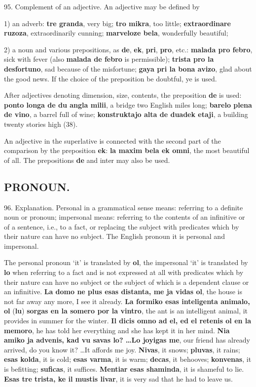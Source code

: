 95. Complement of an adjective. An adjective may be defined by 

1) an adverb: \textbf{tre granda}, very big; \textbf{tro mikra}, too little; \textbf{extraordinare ruzoza}, extraordinarily cunning; \textbf{marveloze bela}, wonderfully beautiful; 

2) a noun and various prepositions, as \textbf{de}, \textbf{ek}, \textbf{pri}, \textbf{pro}, etc.: \textbf{malada pro febro}, sick with fever (also \textbf{malada de febro} is permissible); \textbf{trista pro la desfortuno}, sad because of the misfortune; \textbf{gaya pri la bona avizo}, glad about the good news. If the choice of the preposition be doubtful, ye is used. 

After adjectives denoting dimension, size, contents, the preposition \textbf{de} is used: \textbf{ponto longa de du angla milii}, a bridge two English miles long; \textbf{barelo plena de vino}, a barrel full of wine; \textbf{konstruktajo alta de duadek etaji}, a building twenty stories high (38). 

An adjective in the superlative is connected with the second part of the comparison by the preposition \textbf{ek}: \textbf{la maxim bela ek omni}, the most beautiful of all. The prepositions \textbf{de} and inter may also be used.

\subsection*{PRONOUN.}
96. Explanation. Personal in a grammatical sense means: referring to a definite noun or pronoun; impersonal means: referring to the contents of an infinitive or of a sentence, i.e., to a fact, or replacing the subject with predicates which by their nature can have no subject. The English pronoun it is personal and impersonal. 

The personal pronoun `it' is translated by \textbf{ol}, the impersonal `it' is translated by \textbf{lo} when referring to a fact and is not expressed at all with predicates which by their nature can have no subject or the subject of which is a dependent clause or an infinitive. \textbf{La domo ne plus esas distanta, me ja vidas ol}, the house is not far away any more, I see it already. \textbf{La formiko esas inteligenta animalo, ol }(\textbf{lu})\textbf{ sorgas en la somero por la vintro}, the ant is an intelligent animal, it provides in summer for the winter. \textbf{Il dicis omno ad el, ed el retenis ol en la memoro}, he has told her everything and she has kept it in her mind. \textbf{Nia amiko ja advenis, kad vu savas lo? \ldots Lo joyigas me}, our friend has already arrived, do you know it? \ldots It affords me joy. \textbf{Nivas}, it snows; \textbf{pluvas}, it rains; \textbf{esas kolda}, it is cold; \textbf{esas varma}, it is warm; \textbf{decas}, it behooves; \textbf{konvenas}, it is befitting; \textbf{suficas}, it suffices. \textbf{Mentiar esas shaminda}, it is shameful to lie. \textbf{Esas tre trista, ke il mustis livar}, it is very sad that he had to leave us. 

